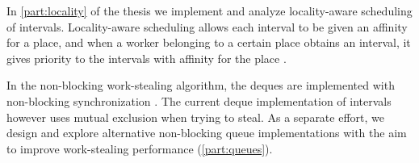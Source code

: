 In \autoref{part:locality} of the thesis we implement and analyze
locality-aware scheduling of intervals. Locality-aware scheduling
allows each interval to be given an affinity for a place, and when a
worker belonging to a certain place obtains an interval, it gives
priority to the intervals with affinity for the place \cite{Acar2002,
  Guo2010}.

In the non-blocking work-stealing algorithm, the deques are
implemented with non-blocking synchronization \cite{Arora2001}. The
current deque implementation of intervals however uses mutual
exclusion when trying to steal. As a separate effort, we design and
explore alternative non-blocking queue implementations with the aim to
improve work-stealing performance (\autoref{part:queues}).


